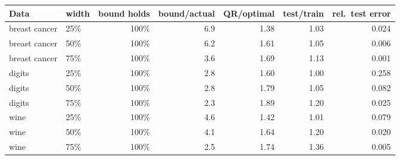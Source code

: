 \begin{tabular}{llrrrrr}\toprule
Data & width & bound holds & bound/actual & QR/optimal & test/train & rel.\ test error\\\midrule
breast cancer & 25\% & 100\% & 6.9 & 1.38 & 1.03 & 0.024\\
breast cancer & 50\% & 100\% & 6.2 & 1.61 & 1.05 & 0.006\\
breast cancer & 75\% & 100\% & 3.6 & 1.69 & 1.13 & 0.001\\
digits & 25\% & 100\% & 2.8 & 1.60 & 1.00 & 0.258\\
digits & 50\% & 100\% & 2.8 & 1.79 & 1.05 & 0.082\\
digits & 75\% & 100\% & 2.3 & 1.89 & 1.20 & 0.025\\
wine & 25\% & 100\% & 4.6 & 1.42 & 1.01 & 0.079\\
wine & 50\% & 100\% & 4.1 & 1.64 & 1.20 & 0.020\\
wine & 75\% & 100\% & 2.5 & 1.74 & 1.36 & 0.005\\
\bottomrule\end{tabular}
